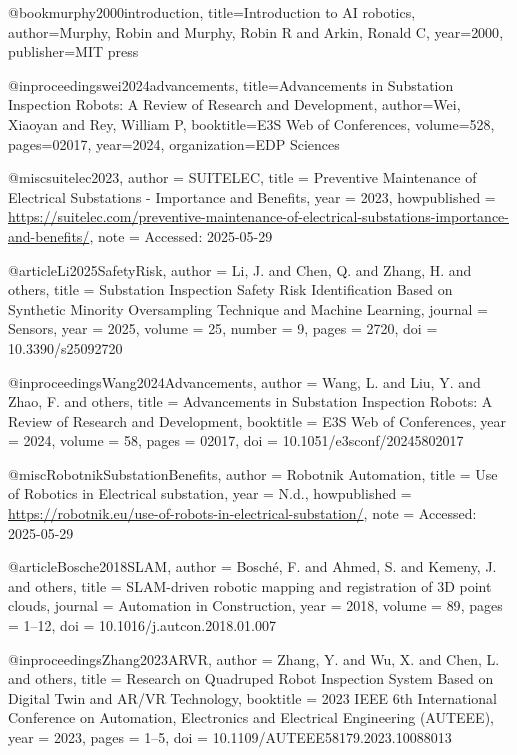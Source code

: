 @book{murphy2000introduction,
  title={Introduction to AI robotics},
  author={Murphy, Robin and Murphy, Robin R and Arkin, Ronald C},
  year={2000},
  publisher={MIT press}
}

@inproceedings{wei2024advancements,
  title={Advancements in Substation Inspection Robots: A Review of Research and Development},
  author={Wei, Xiaoyan and Rey, William P},
  booktitle={E3S Web of Conferences},
  volume={528},
  pages={02017},
  year={2024},
  organization={EDP Sciences}
}

@misc{suitelec2023,
  author       = {{SUITELEC}},
  title        = {Preventive Maintenance of Electrical Substations - Importance and Benefits},
  year         = {2023},
  howpublished = {\url{https://suitelec.com/preventive-maintenance-of-electrical-substations-importance-and-benefits/}},
  note         = {Accessed: 2025-05-29}
}

@article{Li2025SafetyRisk,
  author    = {Li, J. and Chen, Q. and Zhang, H. and others},
  title     = {Substation Inspection Safety Risk Identification Based on Synthetic Minority Oversampling Technique and Machine Learning},
  journal   = {Sensors},
  year      = {2025},
  volume    = {25},
  number    = {9},
  pages     = {2720},
  doi       = {10.3390/s25092720}
}

@inproceedings{Wang2024Advancements,
  author    = {Wang, L. and Liu, Y. and Zhao, F. and others},
  title     = {Advancements in Substation Inspection Robots: A Review of Research and Development},
  booktitle = {E3S Web of Conferences},
  year      = {2024},
  volume    = {58},
  pages     = {02017},
  doi       = {10.1051/e3sconf/20245802017}
}

@misc{RobotnikSubstationBenefits,
  author       = {{Robotnik Automation}},
  title        = {Use of Robotics in Electrical substation},
  year         = {N.d.},
  howpublished = {\url{https://robotnik.eu/use-of-robots-in-electrical-substation/}},
  note         = {Accessed: 2025-05-29}
}

@article{Bosche2018SLAM,
  author    = {Bosché, F. and Ahmed, S. and Kemeny, J. and others},
  title     = {SLAM-driven robotic mapping and registration of 3D point clouds},
  journal   = {Automation in Construction},
  year      = {2018},
  volume    = {89},
  pages     = {1--12},
  doi       = {10.1016/j.autcon.2018.01.007}
}

@inproceedings{Zhang2023ARVR,
  author    = {Zhang, Y. and Wu, X. and Chen, L. and others},
  title     = {Research on Quadruped Robot Inspection System Based on Digital Twin and AR/VR Technology},
  booktitle = {2023 IEEE 6th International Conference on Automation, Electronics and Electrical Engineering (AUTEEE)},
  year      = {2023},
  pages     = {1--5},
  doi       = {10.1109/AUTEEE58179.2023.10088013}
}

